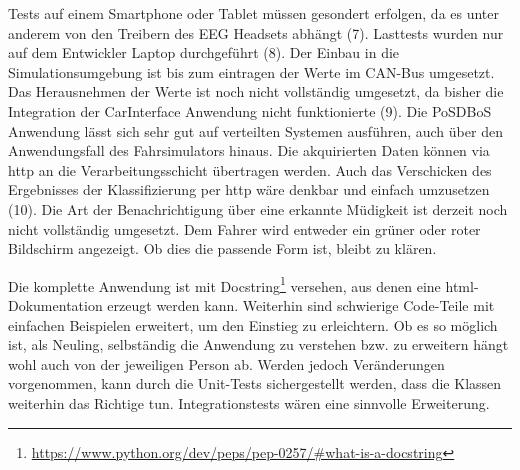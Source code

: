 Tests auf einem Smartphone oder Tablet müssen gesondert erfolgen, da es unter anderem von den Treibern des EEG Headsets abhängt (7). Lasttests wurden nur auf dem Entwickler Laptop durchgeführt (8). Der Einbau in die Simulationsumgebung ist bis zum eintragen der Werte im CAN-Bus umgesetzt. Das Herausnehmen der Werte ist noch nicht vollständig umgesetzt, da bisher die Integration der CarInterface Anwendung nicht funktionierte (9). Die PoSDBoS Anwendung lässt sich sehr gut auf verteilten Systemen ausführen, auch über den Anwendungsfall des Fahrsimulators hinaus. Die akquirierten Daten können via http an die Verarbeitungsschicht übertragen werden. Auch das Verschicken des Ergebnisses der Klassifizierung per http wäre denkbar und einfach umzusetzen (10). Die Art der Benachrichtigung über eine erkannte Müdigkeit ist derzeit noch nicht vollständig umgesetzt. Dem Fahrer wird entweder ein grüner oder roter Bildschirm angezeigt. Ob dies die passende Form ist, bleibt zu klären.

Die komplette Anwendung ist mit Docstring\footnote{\url{https://www.python.org/dev/peps/pep-0257/\#what-is-a-docstring}} versehen, aus denen eine html-Dokumentation erzeugt werden kann. Weiterhin sind schwierige Code-Teile mit einfachen Beispielen erweitert, um den Einstieg zu erleichtern. Ob es so möglich ist, als Neuling, selbständig die Anwendung zu verstehen bzw. zu erweitern hängt wohl auch von der jeweiligen Person ab. Werden jedoch Veränderungen vorgenommen, kann durch die Unit-Tests sichergestellt werden, dass die Klassen weiterhin das Richtige tun. Integrationstests wären eine sinnvolle  Erweiterung.